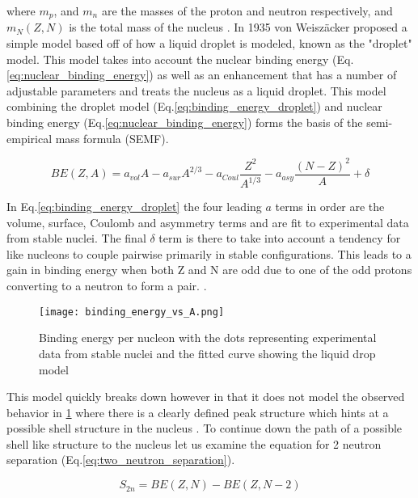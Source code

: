 \documentclass[jon_ringuette_thesis.tex]{subfiles}
\begin{document}
    where $m_p$, and $m_n$ are the masses of the proton and neutron respectively, and $m_N(Z, N)$ is the total mass of the nucleus \cite{Bacca2016}.
    In 1935 von Weisz{\"a}cker proposed a simple model based off of how a liquid droplet is modeled, known as the "droplet" model. This model takes into account the nuclear binding energy (Eq.\ref{eq:nuclear_binding_energy}) as well as an enhancement that has a number of adjustable parameters and treats the nucleus as a liquid droplet. This model combining the droplet model (Eq.\ref{eq:binding_energy_droplet}) and nuclear binding energy (Eq.\ref{eq:nuclear_binding_energy}) forms the basis of the semi-empirical mass formula (SEMF).

    \begin{equation}
        BE(Z, A) = a_{vol} A - a_{sur} A^{2/3} - a_{Coul} \frac{Z^2}{A^{1/3}} - a_{asy} \frac{(N-Z)^2}{A} + \delta
        \label{eq:binding_energy_droplet}
    \end{equation}

    In Eq.\ref{eq:binding_energy_droplet} the four leading $a$ terms in order are the volume, surface, Coulomb and asymmetry terms and are fit to experimental data from stable nuclei. The final $\delta$ term is there to take into account a tendency for like nucleons to couple pairwise primarily in stable configurations. This leads to a gain in binding energy when both Z and N are odd due to one of the odd protons converting to a neutron to form a pair. \cite{Krane1988}.
    \begin{figure}[H]
        \begin{center}
            \texttt{[image: binding\_energy\_vs\_A.png]}
        \end{center}
        \caption{Binding energy per nucleon with the dots representing experimental data from stable nuclei and the fitted curve showing the liquid drop model \cite{Bacca2016}}
        \label{fig:binding_energy_vs_nucleons}
    \end{figure}

    This model quickly breaks down however in that it does not model the observed behavior in \ref{fig:binding_energy_vs_nucleons} where there is a clearly defined peak structure which hints at a possible shell structure in the nucleus \cite{Bacca2016}.
    To continue down the path of a possible shell like structure to the nucleus let us examine the equation for 2 neutron separation (Eq.\ref{eq:two_neutron_separation}).

    \begin{equation}
        S_{2n} = BE(Z, N) - BE(Z, N - 2)
        \label{eq:two_neutron_separation}
    \end{equation}
\end{document}
